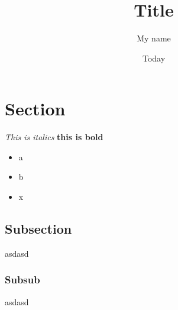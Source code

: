 \documentclass[12pt]{article}
\author{My name}
\date{Today}
\title{Title}
\begin{document}
\maketitle

\section{Section}

\textit{This is italics} \textbf{this is bold} 

\begin{itemize}
\item a
\item b
\item x
\end{itemize}

\subsection{Subsection}

asdasd

\subsubsection{Subsub}

asdasd
\end{document}
